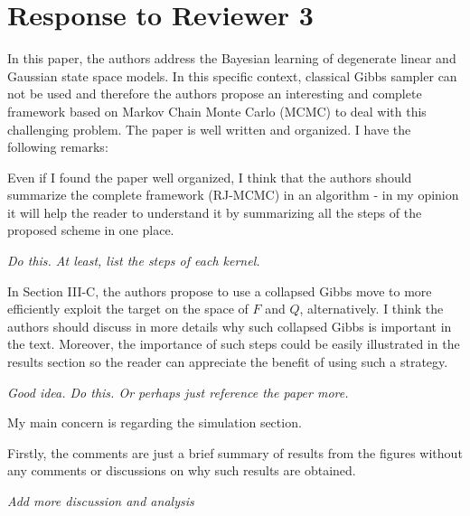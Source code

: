 \documentclass{article}
\newenvironment{review}[0]{\begin{itshape}\color{Gray}\noindent}{\end{itshape}\vspace{0.4cm}}
\newenvironment{response}[0]{\noindent}{\vspace{0.4cm}}
\newcommand{\meta}[1]{{\color{red}\em #1}}
\begin{document}
\section*{Response to Reviewer 3}

\begin{review}
In this paper, the authors address the Bayesian learning of degenerate linear and Gaussian state space models. In this specific context, classical Gibbs sampler can not be used and therefore the authors propose an interesting and complete framework based on Markov Chain Monte Carlo (MCMC) to deal with this challenging problem. The paper is well written and organized. I have the following remarks:

Even if I found the paper well organized, I think that the authors should summarize the complete framework (RJ-MCMC) in an algorithm - in my opinion it will help the reader to understand it by summarizing all the steps of the proposed scheme in one place.
\end{review}

\begin{response}
 \meta{Do this. At least, list the steps of each kernel.}
\end{response}

\begin{review}
In Section III-C, the authors propose to use a collapsed Gibbs move to more efficiently exploit the target on the space of $F$ and $Q$, alternatively. I think the authors should discuss in more details why such collapsed Gibbs is important in the text. Moreover, the importance of such steps could be easily illustrated in the results section so the reader can appreciate the benefit of using such a strategy.
\end{review}

\begin{response}
 \meta{Good idea. Do this. Or perhaps just reference the paper more.}
\end{response}

\begin{review}
My main concern is regarding the simulation section.

Firstly, the comments are just a brief summary of results from the figures without any comments or discussions on why such results are obtained.
\end{review}

\begin{response}
 \meta{Add more discussion and analysis}
\end{response}
\end{document}
